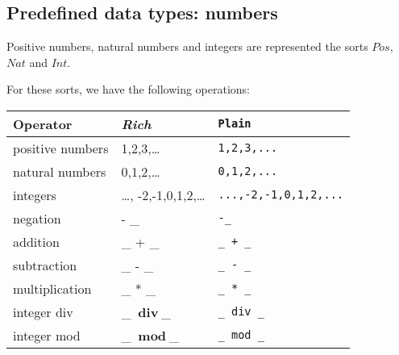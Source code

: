 \documentclass{article}
\newcommand{\frm}[1]{\mbox{\ensuremath{#1}}}
\newcommand{\f}[1]{\ensuremath{\mathit{#1}}}
\renewcommand{\div}{\ensuremath{\ \mathbf{div}\ }}
\renewcommand{\mod}{\ensuremath{\ \mathbf{mod}\ }}
\newcommand{\srtpos}{\f{Pos}}
\newcommand{\srtnat}{\f{Nat}}
\newcommand{\srtint}{\f{Int}}
\begin{document}
\begin{slidetop}
\section*{Predefined data types: numbers}

Positive numbers, natural numbers and integers are represented the sorts \frm{\srtpos}, 
\frm{\srtnat} and \frm{\srtint}. 

\bigskip

For these sorts, we have the following operations:
\begin{center}
\begin{tabular}{|l@{\quad\,}L@{\quad\,}l|}
\hline
Operator                   & \textit{Rich}              & \verb+Plain+\\\hline
positive numbers           & 1,2,3,\ldots               & \verb+1,2,3,...+\\
natural numbers            & 0,1,2,\ldots               & \verb+0,1,2,...+\\
integers                   & \ldots, -2,-1,0,1,2,\ldots & \verb+...,-2,-1,0,1,2,...+\\
negation                   & - \_                       & \verb+-_+\\
addition                   & \_ + \_                    & \verb-_ + _-\\
subtraction                & \_ - \_                    & \verb+_ - _+\\
multiplication             & \_ * \_                    & \verb+_ * _+\\
integer div                & \_ \div \_                 & \verb+_ div _+\\
integer mod                & \_ \mod \_                 & \verb+_ mod _+\\\hline
\end{tabular}
\end{center}
\end{slidetop}
\end{document}
